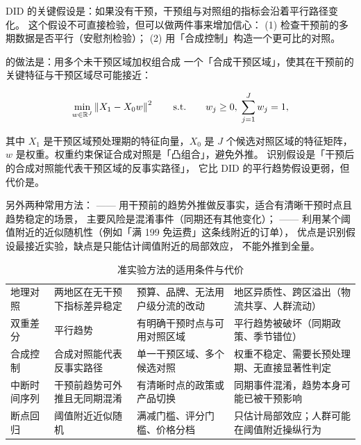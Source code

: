 DID 的关键假设是：如果没有干预，干预组与对照组的指标会沿着平行路径变化。
这个假设不可直接检验，但可以做两件事来增加信心：
(1) 检查干预前的多期数据是否平行（安慰剂检验）；
(2) 用「合成控制」构造一个更可比的对照。

 的做法是：用多个未干预区域加权组合成
一个「合成干预区域」，使其在干预前的关键特征与干预区域尽可能接近：

\begin{equation}
\min_{w \in \mathbb{R}^{J}} \left\lVert X_1 - X_0 w \right\rVert^{2}
\qquad \text{s.t.} \qquad w_j \ge 0,\; \sum_{j=1}^{J} w_j = 1 ,
\label{eq:growth-synth}
\end{equation}

其中 $X_1$ 是干预区域预处理期的特征向量，$X_0$ 是 $J$ 个候选对照区域的特征矩阵，
$w$ 是权重。权重约束保证合成对照是「凸组合」，避免外推。
识别假设是「干预后的合成对照能代表干预区域的反事实路径」，
它比 DID 的平行趋势假设更弱，但代价是。

另外两种常用方法：
——
用干预前的趋势外推做反事实，适合有清晰干预时点且趋势稳定的场景，
主要风险是混淆事件（同期还有其他变化）；
——
利用某个阈值附近的近似随机性（例如「满 199 免运费」这条线附近的订单），
优点是识别假设最接近实验，缺点是只能估计阈值附近的局部效应，
不能外推到全量。

\begin{table}[htbp]
\centering
\caption{准实验方法的适用条件与代价}
\label{tab:growth-quasi}
\small
\begin{tabularx}{\textwidth}{L{2.3cm} L{3.4cm} L{3.2cm} Y}
\toprule
{} &  &  &  \\
\midrule
地理对照 & 两地区在无干预下指标差异稳定 & 预算、品牌、无法用户级分流的改动 & 地区异质性、跨区溢出（物流共享、人群流动） \\
\addlinespace
双重差分 & 平行趋势 & 有明确干预时点与可用对照区域 & 平行趋势被破坏（同期政策、季节错位） \\
\addlinespace
合成控制 & 合成对照能代表反事实路径 & 单一干预区域、多个候选对照 & 权重不稳定、需要长预处理期、无直接显著性判定 \\
\addlinespace
中断时间序列 & 干预前趋势可外推且无同期混淆 & 有清晰时点的政策或产品切换 & 同期事件混淆，趋势本身可能已被干预影响 \\
\addlinespace
断点回归 & 阈值附近近似随机 & 满减门槛、评分门槛、价格分档 & 只估计局部效应；人群可能在阈值附近操纵行为 \\
\bottomrule
\end{tabularx}
\end{table}

